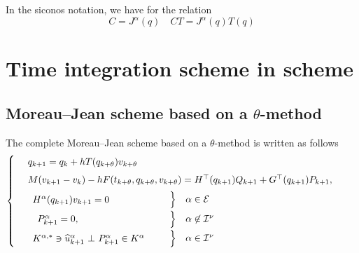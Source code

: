 In the siconos notation, we have for the relation
\begin{equation}
  \label{eq:2}
   C =   J^\alpha(q) \quad CT = J^\alpha(q)T(q)
\end{equation}







\section{Time integration scheme in scheme}


\subsection{Moreau--Jean scheme based on a  $\theta$-method}
The complete Moreau--Jean scheme based on a  $\theta$-method is written as follows
 \begin{equation}
    \label{eq:Moreau--Jean-theta}
    \begin{cases}
      ~~\begin{array}{l}
        q_{k+1} = q_{k} + h T(q_{k+\theta}) v_{k+\theta} \quad \\[1ex]
        M(v_{k+1}-v_k) - h  F(t_{k+\theta}, q_{k+\theta},v_{k+\theta}) =  H^\top(q_{k+1}) Q_{k+1} + G^\top(q_{k+1}) P_{k+1},\quad\,\\[1ex]
      \end{array}\\
      ~~\begin{array}{lcl}
        \begin{array}{l}
          H^\alpha(q_{k+1}) v_{k+1}  =  0\\
        \end{array} & \left. \begin{array}{l}
          \vphantom{H^\alpha(q_{k+1}) v_{k+1}  =  0}\\[1ex]
        \end{array}\right\}    &\alpha \in \mathcal E  \\[1ex]
      ~~~P_{k+1}^\alpha= 0, &
      \left. \begin{array}{l}
          \vphantom{P_{k+1}^\alpha= 0,  \delta^\alpha_{k+1}=0}\\[1ex]
        \end{array}\right\}   & \alpha \not\in \mathcal I^\nu \\[1ex]
      \begin{array}{l}
          {K}^{\alpha,*} \ni \widehat u_{k+1}^\alpha~ \bot~ P_{k+1}^\alpha \in {K}^\alpha \\
      \end{array} &
      \left.\begin{array}{l}
          \vphantom{{K}^{\alpha,*} \ni \widehat u_{k+1}^\alpha~ \bot~ P_{k+1}^\alpha \in {K}^\alpha} \\
        \end{array}\right\}
      &\alpha \in \mathcal I^\nu\\
  \end{array}
\end{cases}
\end{equation}
